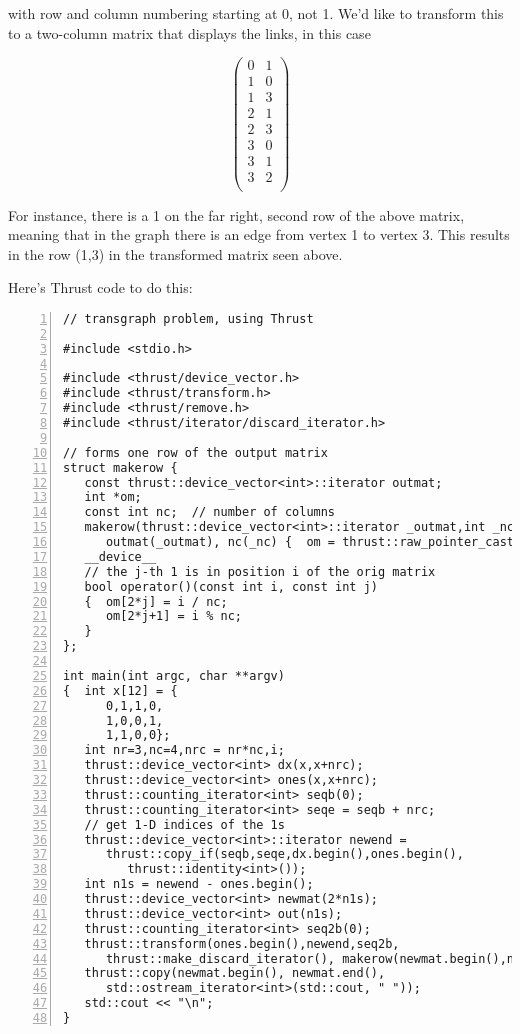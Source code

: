 with row and column numbering starting at 0, not 1.  We'd like to
transform this to a two-column matrix that displays the links, in this
case

\begin{equation}
\left (
\begin{array}{rr}
0 & 1 \\
1 & 0 \\
1 & 3 \\
2 & 1 \\
2 & 3 \\
3 & 0 \\
3 & 1 \\
3 & 2 \\
\end{array}
\right )
\end{equation}

For instance, there is a 1 on the far right, second row of the above
matrix, meaning that in the graph there is an edge from vertex 1 to
vertex 3.  This results in the row (1,3) in the transformed matrix seen
above.

Here's Thrust code to do this:

\begin{lstlisting}[numbers=left]
// transgraph problem, using Thrust

#include <stdio.h>

#include <thrust/device_vector.h>
#include <thrust/transform.h>
#include <thrust/remove.h>
#include <thrust/iterator/discard_iterator.h>

// forms one row of the output matrix
struct makerow {
   const thrust::device_vector<int>::iterator outmat;
   int *om;
   const int nc;  // number of columns
   makerow(thrust::device_vector<int>::iterator _outmat,int _nc) :
      outmat(_outmat), nc(_nc) {  om = thrust::raw_pointer_cast(&outmat[0]);  }
   __device__
   // the j-th 1 is in position i of the orig matrix
   bool operator()(const int i, const int j)
   {  om[2*j] = i / nc;
      om[2*j+1] = i % nc;
   }
};

int main(int argc, char **argv)
{  int x[12] = {
      0,1,1,0,
      1,0,0,1,
      1,1,0,0};
   int nr=3,nc=4,nrc = nr*nc,i;
   thrust::device_vector<int> dx(x,x+nrc);
   thrust::device_vector<int> ones(x,x+nrc);
   thrust::counting_iterator<int> seqb(0);
   thrust::counting_iterator<int> seqe = seqb + nrc;
   // get 1-D indices of the 1s
   thrust::device_vector<int>::iterator newend =
      thrust::copy_if(seqb,seqe,dx.begin(),ones.begin(),
         thrust::identity<int>());
   int n1s = newend - ones.begin();
   thrust::device_vector<int> newmat(2*n1s);
   thrust::device_vector<int> out(n1s);
   thrust::counting_iterator<int> seq2b(0);
   thrust::transform(ones.begin(),newend,seq2b,
      thrust::make_discard_iterator(), makerow(newmat.begin(),nc));
   thrust::copy(newmat.begin(), newmat.end(),
      std::ostream_iterator<int>(std::cout, " "));
   std::cout << "\n";
}
\end{lstlisting}


